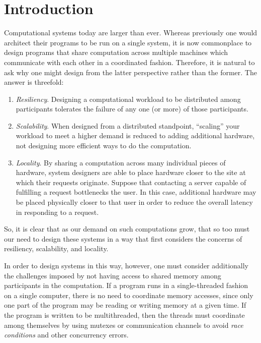 \chapter{Introduction}

Computational systems today are larger than ever. Whereas previously one would
architect their programs to be run on a single system, it is now commonplace to
design programs that share computation across multiple machines which
communicate with each other in a coordinated fashion. Therefore, it is natural
to ask why one might design from the latter perspective rather than the former.
The answer is threefold:
\begin{enumerate}
  \item \emph{Resiliency}. Designing a computational workload to be distributed
    among participants tolerates the failure of any one (or more) of those
    participants.
  \item \emph{Scalability}. When designed from a distributed standpoint,
    ``scaling'' your workload to meet a higher demand is reduced to adding
    additional hardware, not designing more efficient ways to do the
    computation.
  \item \emph{Locality}. By sharing a computation across many individual pieces
    of hardware, system designers are able to place hardware closer to the site
    at which their requests originate. Suppose that contacting a server capable
    of fulfilling a request bottlenecks the user. In this case, additional
    hardware may be placed physically closer to that user in order to reduce the
    overall latency in responding to a request.
\end{enumerate}

So, it is clear that as our demand on such computations grow, that so too
must our need to design these systems in a way that first considers the concerns
of resiliency, scalability, and locality.

In order to design systems in this way, however, one must consider additionally
the challenges imposed by not having access to shared memory among
participants in the computation. If a program runs in a single-threaded fashion
on a single computer, there is no need to coordinate memory accesses, since only
one part of the program may be reading or writing memory at a given time. If the
program is written to be multithreaded, then the threads must coordinate
among themselves by using mutexes or communication channels to avoid
\textit{race conditions} and other concurrency errors.


